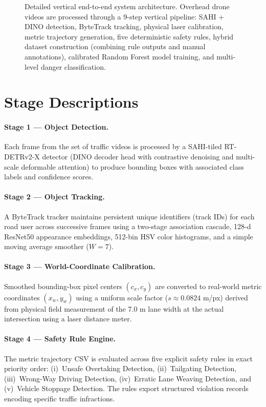 \begin{figure}[p]
\begin{tikzpicture}
\end{tikzpicture}
\caption{Detailed vertical end-to-end system architecture. Overhead drone videos are processed through a 9-step vertical pipeline: SAHI + DINO detection, ByteTrack tracking, physical laser calibration, metric trajectory generation, five deterministic safety rules, hybrid dataset construction (combining rule outputs and manual annotations), calibrated Random Forest model training, and multi-level danger classification.}
\label{fig:system_arch}
\end{figure}
\clearpage

\section{Stage Descriptions}

\paragraph{Stage 1 — Object Detection.}
Each frame from the set of traffic videos is processed by a SAHI-tiled RT-DETRv2-X detector (DINO decoder head with contrastive denoising and multi-scale deformable attention) to produce bounding boxes with associated class labels and confidence scores.

\paragraph{Stage 2 — Object Tracking.}
A ByteTrack tracker maintains persistent unique identifiers (track IDs) for each road user across successive frames using a two-stage association cascade, 128-d ResNet50 appearance embeddings, 512-bin HSV color histograms, and a simple moving average smoother ($W = 7$).

\paragraph{Stage 3 — World-Coordinate Calibration.}
Smoothed bounding-box pixel centers $(c_x, c_y)$ are converted to real-world metric coordinates $(x_w, y_w)$ using a uniform scale factor ($s \approx 0.0824$ m/px) derived from physical field measurement of the 7.0 m lane width at the actual intersection using a laser distance meter.

\paragraph{Stage 4 — Safety Rule Engine.}
The metric trajectory CSV is evaluated across five explicit safety rules in exact priority order: (i)~Unsafe Overtaking Detection, (ii)~Tailgating Detection, (iii)~Wrong-Way Driving Detection, (iv)~Erratic Lane Weaving Detection, and (v)~Vehicle Stoppage Detection. The rules export structured violation records encoding specific traffic infractions.


